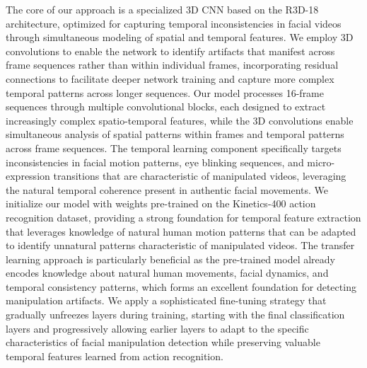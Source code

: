 \documentclass[conference]{IEEEtran}
\begin{document}
The core of our approach is a specialized 3D CNN based on the R3D-18 architecture, optimized for capturing temporal inconsistencies in facial videos through simultaneous modeling of spatial and temporal features.
We employ 3D convolutions to enable the network to identify artifacts that manifest across frame sequences rather than within individual frames, incorporating residual connections to facilitate deeper network training and capture more complex temporal patterns across longer sequences.
Our model processes 16-frame sequences through multiple convolutional blocks, each designed to extract increasingly complex spatio-temporal features, while the 3D convolutions enable simultaneous analysis of spatial patterns within frames and temporal patterns across frame sequences.
The temporal learning component specifically targets inconsistencies in facial motion patterns, eye blinking sequences, and micro-expression transitions that are characteristic of manipulated videos, leveraging the natural temporal coherence present in authentic facial movements.
We initialize our model with weights pre-trained on the Kinetics-400 action recognition dataset, providing a strong foundation for temporal feature extraction that leverages knowledge of natural human motion patterns that can be adapted to identify unnatural patterns characteristic of manipulated videos.
The transfer learning approach is particularly beneficial as the pre-trained model already encodes knowledge about natural human movements, facial dynamics, and temporal consistency patterns, which forms an excellent foundation for detecting manipulation artifacts.
We apply a sophisticated fine-tuning strategy that gradually unfreezes layers during training, starting with the final classification layers and progressively allowing earlier layers to adapt to the specific characteristics of facial manipulation detection while preserving valuable temporal features learned from action recognition.
\end{document}
